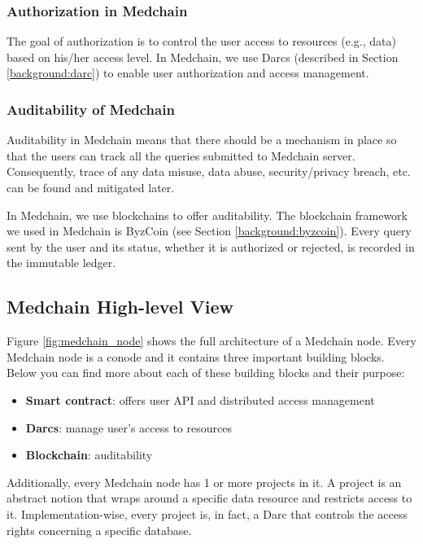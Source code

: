 \subsubsection{Authorization in Medchain}\label{arch:authorization}
The goal of authorization is to control the user access to resources (e.g., data) based on his/her access level. In Medchain, we use Darcs (described in Section \ref{background:darc}) to enable user authorization and access management. 


\subsubsection{Auditability of Medchain} \label{arch:audit}
Auditability in Medchain means that there should be a mechanism in place so that the users can track all the queries submitted to Medchain server. Consequently, trace of any data misuse, data abuse, security/privacy breach, etc. can be found and mitigated later. 

In Medchain, we use blockchains to offer auditability. The blockchain framework we used in Medchain is ByzCoin (see Section \ref{background:byzcoin}). Every query sent by the user and its status, whether it is authorized or rejected, is recorded in the immutable ledger. 

\subsection{Medchain High-level View} \label{arch:high-level view}

Figure \ref{fig:medchain_node} shows the full architecture of a Medchain node. Every Medchain node is a conode and it contains three important building blocks. Below you can find more about each of these building blocks and their purpose:
\begin{itemize}
    \item \textbf{Smart contract}: offers user API and distributed access management 
    \item \textbf{Darcs}: manage user's access to resources 
    \item \textbf{Blockchain}: auditability 
\end{itemize}

Additionally, every Medchain node has 1 or more projects in it. A project is an abstract notion that wraps around a specific data resource and restricts access to it. Implementation-wise, every project is, in fact, a Darc that controls the access rights concerning a specific database.

